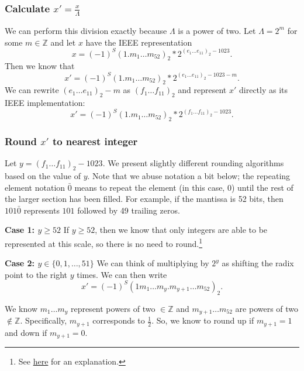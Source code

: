 \documentclass[11pt]{scrartcl} %
\begin{document}
\subsubsection{Calculate $x' = \frac{x}{\Lambda}$}
\label{subsec:calculate_xprime}
We can perform this division exactly because $\Lambda$ is a power of two. Let $\Lambda = 2^m$ for some $m \in \mathbb{Z}$ and let $x$ have the IEEE representation
\[ x = (-1)^S (1.m_{1} \hdots m_{52})_2 * 2^{(e_1 \hdots e_{11})_2-1023}. \]
Then we know that
\[ x' = (-1)^S (1.m_{1} \hdots m_{52})_2 * 2^{(e_1 \hdots e_{11})_2-1023-m}. \]
We can rewrite $(e_1 \hdots e_{11})_2 - m$ as $(f_1 \hdots f_{11})_2$ and represent $x'$ directly as its IEEE implementation:
\[ x' = (-1)^S (1.m_{1} \hdots m_{52})_2 * 2^{(f_1 \hdots f_{11})_2-1023}. \]

\subsubsection{Round $x'$ to nearest integer}
\label{subsec:round_xprime}
Let $y = (f_1 \hdots f_{11})_2-1023$. We present slightly different rounding algorithms based on the value of $y$. Note that we abuse notation a bit below; the repeating element notation $\bar{0}$ means to repeat the element (in this case, 0) until the rest of the larger section has been filled. For example, if the mantissa is 52 bits, then $101\bar{0}$ represents $101$ followed by 49 trailing zeros. \newline

\textbf{Case 1: $y \geq 52$} \newline
If $y \geq 52$, then we know that only integers are able to be represented at this scale, so there is no need to round.\footnote{See \href{https://www.exploringbinary.com/the-spacing-of-binary-floating-point-numbers/}{here} for an explanation.} \newline

\textbf{Case 2: $y \in \{0, 1, \hdots, 51\}$} \newline
We can think of multiplying by $2^y$ as shifting the radix point to the right $y$ times. We can then write
\[ x' = (-1)^S (1m_1 \hdots m_y.m_{y+1} \hdots m_{52})_2. \]

We know $m_1 \hdots m_y$ represent powers of two $\in \mathbb{Z}$ and $m_{y+1} \hdots m_{52}$ are powers of two $\not \in \mathbb{Z}$. Specifically, $m_{y+1}$ corresponds to $\frac{1}{2}$. So, we know to round up if $m_{y+1} = 1$ and down if $m_{y+1} = 0$. \newline
\end{document}
